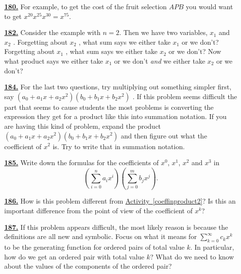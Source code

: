 \documentclass[10pt,]{book}
\theoremstyle{plain}
\theoremstyle{definition}
\theoremstyle{definition}
\theoremstyle{definition}
\numberwithin{equation}{chapter}
\begin{document}
\begin{itemize}[itemsep=1em]
\hypertarget{a-180}{}\item[\textbf{\hyperref[activity-180]{180.}}]
\hypertarget{p-857}{}%
For example, to get the cost of the fruit selection \(AP B\) you would want to get \(x^{20} x^{25} x^{30} = x^{75}\).%

\hypertarget{a-182}{}\item[\textbf{\hyperref[reprovingbinomialtheorem]{182.}}]
\hypertarget{p-862}{}%
Consider the example with \(n = 2\). Then we have two variables, \(x_1\) and \(x_2\) .  Forgetting about \(x_2\) , what sum says we either take \(x_1\) or we don't? Forgetting about \(x_1\) , what sum says we either take \(x_2\) or we don't? Now what product says we either take \(x_1\) or we don't \emph{and} we either take \(x_2\) or we don't?%

\hypertarget{a-184}{}\item[\textbf{\hyperref[coeffinproduct1]{184.}}]
\hypertarget{p-871}{}%
For the last two questions, try multiplying out something simpler first, say \((a_0 + a_1 x + a_2 x^2 )(b_0 + b_1 x + b_2 x^2 )\) . If this problem seems difficult the part that seems to cause students the most problems is converting the expression they get for a product like this into summation notation. If you are having this kind of problem, expand the product \((a_0 + a_1 x + a_2 x^2 )(b_0 + b_1 x + b_2 x^2 )\) and then figure out what the coefficient of \(x^2\) is. Try to write that in summation notation.%

\hypertarget{a-185}{}\item[\textbf{\hyperref[coeffinproduct2]{185.}}]
\hypertarget{p-875}{}%
Write down the formulas for the coefficients of \(x^0\), \(x^1\), \(x^2\) and \(x^3\) in%
\begin{equation*}
\left(\sum_{i=0}^n a_ix^i\right)\left(\sum_{j=0}^m b_jx^j\right)\text{.}
\end{equation*}
%

\hypertarget{a-186}{}\item[\textbf{\hyperref[coeffinpowerseries]{186.}}]
\hypertarget{p-878}{}%
How is this problem different from \hyperref[coeffinproduct2]{Activity~\ref{coeffinproduct2}}? Is this an important difference from the point of view of the coefficient of \(x^k\)?%

\hypertarget{a-187}{}\item[\textbf{\hyperref[ProductPrincipleOGF]{187.}}]
\hypertarget{p-883}{}%
If this problem appears difficult, the most likely reason is because the definitions are all new and symbolic. Focus on what it means for \(\sum_{k=0}^\infty c_kx^k\) to be the generating function for ordered pairs of total value \(k\). In particular, how do we get an ordered pair with total value \(k\)? What do we need to know about the values of the components of the ordered pair?%


\end{itemize}
\end{document}
